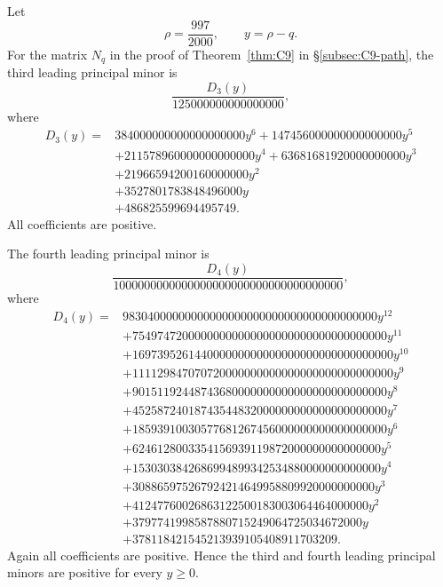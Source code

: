 \documentclass[11pt]{article}
\begin{document}
Let
\[
        \rho=\frac{997}{2000},
        \qquad
        y=\rho-q.
\]
For the matrix $N_q$ in the proof of Theorem~\ref{thm:C9} in \S\ref{subsec:C9-path}, the third leading principal minor is
\[
\frac{D_3(y)}{125000000000000000},
\]
where
\[
\begin{aligned}
D_3(y)={}&384000000000000000000y^6
+147456000000000000000y^5\\
&+211578960000000000000y^4
+63681681920000000000y^3\\
&+21966594200160000000y^2\\
&+3527801783848496000y\\
&+486825599694495749.
\end{aligned}
\]
All coefficients are positive.

The fourth leading principal minor is
\[
\frac{D_4(y)}{1000000000000000000000000000000000000},
\]
where
\[
\begin{aligned}
D_4(y)={}&98304000000000000000000000000000000000000y^{12}\\
&+75497472000000000000000000000000000000000y^{11}\\
&+169739526144000000000000000000000000000000y^{10}\\
&+111129847070720000000000000000000000000000y^9\\
&+90151192448743680000000000000000000000000y^8\\
&+45258724018743544832000000000000000000000y^7\\
&+18593910030577681267456000000000000000000y^6\\
&+6246128003354156939119872000000000000000y^5\\
&+1530303842686994899342534880000000000000y^4\\
&+308865975267924214649958809920000000000y^3\\
&+41247760026863122500183003064464000000y^2\\
&+3797741998587880715249064725034672000y\\
&+378118421545213939105408911703209.
\end{aligned}
\]
Again all coefficients are positive.  Hence the third and fourth leading principal minors are positive for every $y\ge0$.
\end{document}
